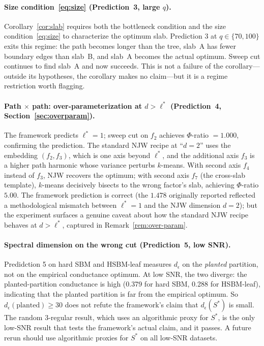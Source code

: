 \documentclass{article}
\theoremstyle{definition}
\theoremstyle{remark}
\begin{document}
\paragraph{Size condition~\eqref{eq:size} (Prediction~3, large $q$).} Corollary~\ref{cor:slab} requires both the bottleneck condition and the size condition~\eqref{eq:size} to characterize the optimum slab. Prediction 3 at $q \in \{70, 100\}$ exits this regime: the path becomes longer than the tree, slab~A has fewer boundary edges than slab~B, and slab~A becomes the actual optimum. Sweep cut continues to find slab~A and now succeeds. This is not a failure of the corollary---outside its hypotheses, the corollary makes no claim---but it is a regime restriction worth flagging.

\paragraph{Path $\times$ path: over-parameterization at $d > \ell^*$ (Prediction~4, Section~\ref{sec:overparam}).} The framework predicts $\ell^* = 1$; sweep cut on $f_2$ achieves $\Phi$-ratio $= 1.000$, confirming the prediction. The standard NJW recipe at ``$d=2$'' uses the embedding $(f_2, f_3)$, which is one axis beyond $\ell^*$, and the additional axis $f_3$ is a higher path harmonic whose variance perturbs $k$-means. With second axis $f_4$ instead of $f_3$, NJW recovers the optimum; with second axis $f_7$ (the cross-slab template), $k$-means decisively bisects to the wrong factor's slab, achieving $\Phi$-ratio $5.00$. The framework prediction is correct (the $1.478$ originally reported reflected a methodological mismatch between $\ell^* = 1$ and the NJW dimension $d = 2$); but the experiment surfaces a genuine caveat about how the standard NJW recipe behaves at $d > \ell^*$, captured in Remark~\ref{rem:over-param}.

\paragraph{Spectral dimension on the wrong cut (Prediction~5, low SNR).} Predidction 5 on hard SBM and HSBM-leaf measures $d_\epsilon$ on the \emph{planted} partition, not on the empirical conductance optimum. At low SNR, the two diverge: the planted-partition conductance is high (0.379 for hard SBM, 0.288 for HSBM-leaf), indicating that the planted partition is far from the empirical optimum. So $d_\epsilon(\text{planted}) \geq 30$ does not refute the framework's claim that $d_\epsilon(S^*)$ is small. The random 3-regular result, which uses an algorithmic proxy for $S^*$, is the only low-SNR result that tests the framework's actual claim, and it passes. A future rerun should use algorithmic proxies for $S^*$ on all low-SNR datasets.
\end{document}
